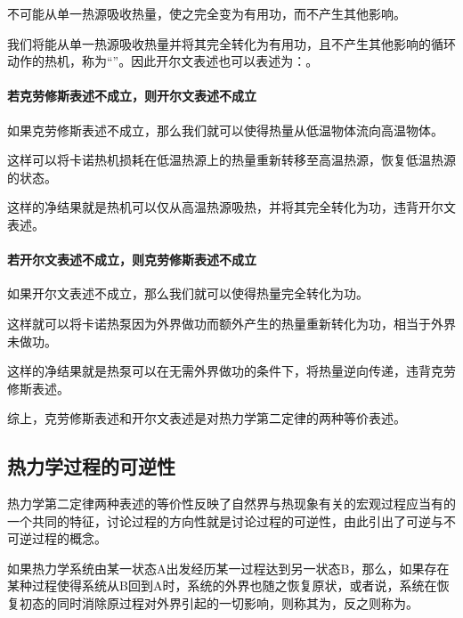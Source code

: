 \begin{OldBoxLaw}[热力学第二定律的开尔文表述]
    不可能从单一热源吸收热量，使之完全变为有用功，而不产生其他影响。
\end{OldBoxLaw}
我们将能从单一热源吸收热量并将其完全转化为有用功，且不产生其他影响的循环动作的热机，称为“”。因此开尔文表述也可以表述为：。
\begin{Proof}[克劳修斯表述和开尔文表述的等价性]
\paragraph{若克劳修斯表述不成立，则开尔文表述不成立}
如果克劳修斯表述不成立，那么我们就可以使得热量从低温物体流向高温物体。

这样可以将卡诺热机损耗在低温热源上的热量重新转移至高温热源，恢复低温热源的状态。

这样的净结果就是热机可以仅从高温热源吸热，并将其完全转化为功，违背开尔文表述。

\paragraph{若开尔文表述不成立，则克劳修斯表述不成立}
如果开尔文表述不成立，那么我们就可以使得热量完全转化为功。

这样就可以将卡诺热泵因为外界做功而额外产生的热量重新转化为功，相当于外界未做功。

这样的净结果就是热泵可以在无需外界做功的条件下，将热量逆向传递，违背克劳修斯表述。\vspace{1ex}

综上，克劳修斯表述和开尔文表述是对热力学第二定律的两种等价表述。
\end{Proof}

\subsection{热力学过程的可逆性}
\label{subsec:热力学过程的可逆性}
热力学第二定律两种表述的等价性反映了自然界与热现象有关的宏观过程应当有的一个共同的特征，讨论过程的方向性就是讨论过程的可逆性，由此引出了可逆与不可逆过程的概念。
\begin{OldBoxDefinition}[可逆过程]
    如果热力学系统由某一状态A出发经历某一过程达到另一状态B，那么，如果存在某种过程使得系统从B回到A时，系统的外界也随之恢复原状，或者说，系统在恢复初态的同时消除原过程对外界引起的一切影响，则称其为，反之则称为。
\end{OldBoxDefinition}

